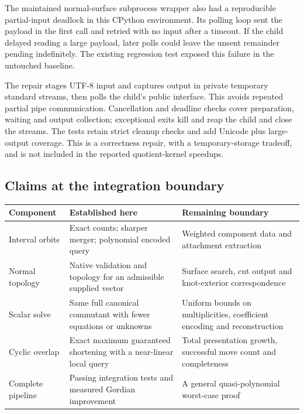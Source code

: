 The maintained normal-surface subprocess wrapper also had a reproducible
partial-input deadlock in this CPython environment. Its polling loop sent
the payload in the first  call and retried with no input
after a timeout. If the child delayed reading a large payload, later polls
could leave the unsent remainder pending indefinitely. The existing
regression test exposed this failure in the untouched baseline.

The repair stages UTF-8 input and captures output in private temporary
standard streams, then polls the child's public  interface.
This avoids repeated partial pipe communication. Cancellation and deadline
checks cover preparation, waiting and output collection; exceptional exits
kill and reap the child and close the streams. The tests retain strict
cleanup checks and add Unicode plus large-output coverage. This is a
correctness repair, with a temporary-storage tradeoff, and is not included
in the reported quotient-kernel speedups.

\subsection{Claims at the integration boundary}

\begin{center}\small
\begin{tabularx}{\textwidth}{@{}p{33mm}XX@{}}
\toprule
Component & Established here & Remaining boundary\\\midrule
Interval orbits & Exact counts; sharper merger; polynomial encoded query & Weighted component data and attachment extraction\\
Normal topology & Native validation and topology for an admissible supplied vector & Surface search, cut output and knot-exterior correspondence\\
Scalar solve & Same full canonical commutant with fewer equations or unknowns & Uniform bounds on multiplicities, coefficient encoding and reconstruction\\
Cyclic overlap & Exact maximum guaranteed shortening with a near-linear local query & Total presentation growth, successful move count and completeness\\
Complete pipeline & Passing integration tests and measured Gordian improvement & A general quasi-polynomial worst-case proof\\
\bottomrule
\end{tabularx}
\end{center}

